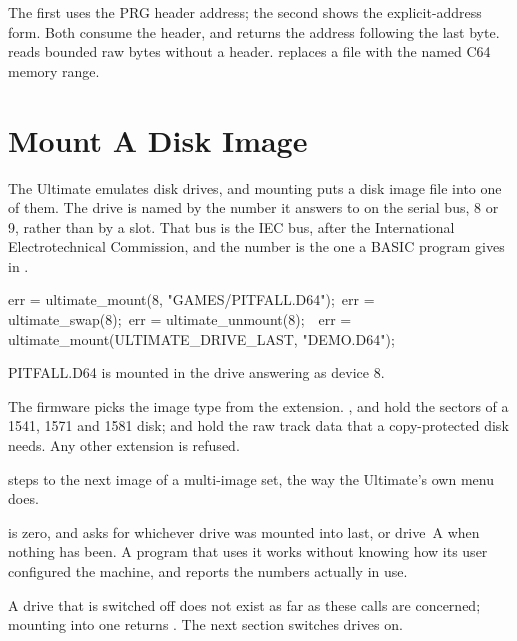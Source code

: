 The first  uses the PRG header address; the second shows
the explicit-address form. Both consume the header, and
 returns the address following the last byte.
 reads bounded raw bytes without a header.
 replaces a file with the named C64 memory range.


\section{Mount A Disk Image}

The Ultimate emulates disk drives, and mounting puts a disk image file into
one of them. The drive is named by the number it answers to on the serial bus,
8 or 9, rather than by a slot. That bus is the IEC bus, after the
International Electrotechnical Commission, and the number is the one a BASIC
program gives in .

\begin{listingbox}
err = ultimate\_mount(8, "GAMES/PITFALL.D64");\
err = ultimate\_swap(8);\
err = ultimate\_unmount(8);\
\
err = ultimate\_mount(ULTIMATE\_DRIVE\_LAST, "DEMO.D64");
\end{listingbox}

\begin{resultbox}
PITFALL.D64 is mounted in the drive answering as device 8.
\end{resultbox}

The firmware picks the image type from the extension. , 
and \cmd{.D81} hold the sectors of a 1541, 1571 and 1581 disk;  and
\cmd{.G71} hold the raw track data that a copy-protected disk needs. Any other
extension is refused.

\cmd{ultimate\_swap()} steps to the next image of a multi-image set, the way
the Ultimate's own menu does.

 is zero, and asks for whichever drive was mounted
into last, or drive~A when nothing has been. A program that uses it works
without knowing how its user configured the machine, and
 reports the numbers actually in use.

A drive that is switched off does not exist as far as these calls are
concerned; mounting into one returns . The next
section switches drives on.

